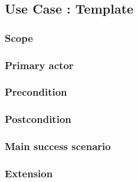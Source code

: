 \subsection{Use Case : Template}

\subsubsection{Scope}

\subsubsection{Primary actor}

\subsubsection{Precondition}

\subsubsection{Postcondition}

\subsubsection{Main success scenario}

\subsubsection{Extension}
